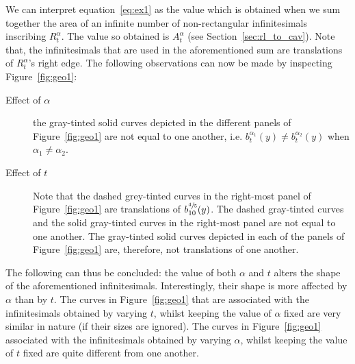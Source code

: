 \documentclass[twoside,reqno,11pt]{fcaa-var} %
\begin{document}
\noindent
We can interpret equation~\eqref{eq:ex1} as the value which is obtained when we sum together the area of an infinite number of non-rectangular infinitesimals inscribing $R_{t}^{\alpha}$. The value so obtained is $A_{t}^{\alpha}$ (see Section~\ref{sec:rl_to_cav}). Note that, the infinitesimals that are used in the aforementioned sum are translations of $R_{t}^{\alpha}$'s right edge. The following observations can now be made by inspecting Figure~\ref{fig:geo1}: 
\begin{description}
 \item[Effect of $\alpha$] the gray-tinted solid curves depicted in the different panels of Figure~\ref{fig:geo1} are not equal to one another, i.e. $b_{t}^{\alpha_1}(y)\neq b_{t}^{\alpha_2}(y)$ when $\alpha_1\neq\alpha_2$. 
 \item[Effect of $t$] Note that the dashed grey-tinted curves in the right-most panel of Figure~\ref{fig:geo1} are translations of $b_{10}^{\sfrac{4}{5}}(y)$. The dashed gray-tinted curves and the solid gray-tinted curves in the right-most panel are not equal to one another. The gray-tinted solid curves depicted in each of the panels of Figure~\ref{fig:geo1} are, therefore, not translations of one another. 
\end{description}
The following can thus be concluded: the value of both $\alpha$ and $t$ alters the shape of the aforementioned infinitesimals. Interestingly, their shape is more affected by $\alpha$ than by $t$. The curves in Figure~\ref{fig:geo1} that are associated with the infinitesimals obtained by varying $t$, whilst keeping the value of $\alpha$ fixed are very similar in nature (if their 
sizes are ignored). The curves in Figure~\ref{fig:geo1} associated with the infinitesimals obtained by varying $\alpha$, whilst keeping the value of $t$ fixed are quite different from one another.\\  

\end{document}
